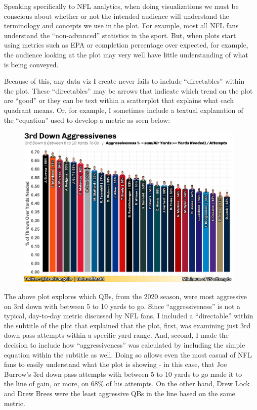 \documentclass[
  letterpaper,
]{krantz}
\begin{document}
Speaking specifically to NFL analytics, when doing visualizations we
must be conscious about whether or not the intended audience will
understand the terminology and concepts we use in the plot. For example,
most all NFL fans understand the ``non-advanced'' statistics in the
sport. But, when plots start using metrics such as EPA or completion
percentage over expected, for example, the audience looking at the plot
may very well have little understanding of what is being conveyed.

Because of this, any data viz I create never fails to include
``directables'' within the plot. These ``directables'' may be arrows
that indicate which trend on the plot are ``good'' or they can be text
within a scatterplot that explains what each quadrant means. Or, for
example, I sometimes include a textual explanation of the ``equation''
used to develop a metric as seen below:

\begin{figure}

{\centering \includegraphics[width=4.58333in,height=\textheight]{images/finished-aggressiveness.png}

}

\end{figure}

The above plot explores which QBs, from the 2020 season, were most
aggressive on 3rd down with between 5 to 10 yards to go. Since
``aggressiveness'' is not a typical, day-to-day metric discussed by NFL
fans, I included a ``directable'' within the subtitle of the plot that
explained that the plot, first, was examining just 3rd down pass
attempts within a specific yard range. And, second, I made the decision
to include how ``aggressiveness'' was calculated by including the simple
equation within the subtitle as well. Doing so allows even the most
casual of NFL fans to easily understand what the plot is showing - in
this case, that Joe Burrow's 3rd down pass attempts with between 5 to 10
yards to go made it to the line of gain, or more, on 68\% of his
attempts. On the other hand, Drew Lock and Drew Brees were the least
aggressive QBs in the line based on the same metric.
\end{document}
